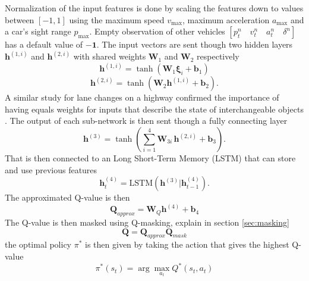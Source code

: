 Normalization of the input features is done by scaling the features down to values between $[-1,1]$ using the maximum speed $v_{\max}$, maximum acceleration $a_{\max}$ and a car's sight range $p_{\max}$. Empty observation of other vehicles $[p^n_t \quad v^n_t \quad a^n_t \quad \delta^n ]$ has a default value of $-\mathbf{1}$. The input vectors are sent though two hidden layers $\bm{h}^{(1, i)}$ and $\bm{h}^{(2, i)}$ with shared weights $\bm{W}_1$ and $\bm{W}_2$ respectively
\begin{equation}
\bm{h}^{(1, i)} = \tanh\left(\bm{W}_1 \bm\xi_i + \bm{b}_1\right)
\end{equation}
\begin{equation}
\bm{h}^{(2, i)} = \tanh\left(\bm{W}_2 \bm{h}^{(1, i)} + \bm{b}_2\right).
\end{equation}
A similar study for lane changes on a highway confirmed the importance of having equals weights for inputs that describe the state of interchangeable objects \cite{Hoel2018}. The output of each sub-network is then sent though a fully connecting layer 
\begin{equation}
\label{eq:shared_weights}
\bm{h}^{(3)} = \tanh\left(\sum_{i=1}^4 \bm{W}_{3i} \, \bm{h}^{(2, i)} + \bm{b}_3\right).
\end{equation}
That is then connected to an Long Short-Term Memory (LSTM) \cite{Hochreiter1997LONGMEMORY} that can store and use previous features
\begin{equation}
\bm{h}^{(4)}_t = \text{LSTM}\left( \bm{h}^{(3)} | \bm{h}^{(4)}_{t-1} \right).
\end{equation}
The approximated Q-value is then
\begin{equation}
\bm{Q}_{approx} = \bm{W}_Q \bm{h}^{(4)}+ \bm{b}_4
\end{equation}
The Q-value is then masked using Q-masking, explain in section \ref{sec:masking}
\begin{equation}
\bm{Q} = \bm{Q}_{approx}  \bm{Q}_{mask}
\end{equation}
the optimal policy $\pi^*$ is then given by taking the action that gives the highest Q-value
\begin{equation}
\pi^*(s_t) = \arg\max_{a_t} Q^*(s_t,a_t)
\end{equation}

